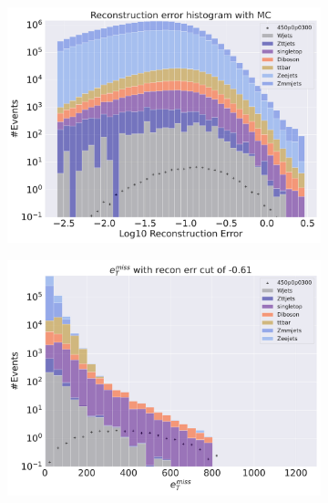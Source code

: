 \begin{figure}[H]
    \centering
    \begin{subfigure}{.40\textwidth}
        \includegraphics[width=\textwidth]{Figures/VAE_testing/small/2lep/b_data_recon_big_rm3_feats_sig_450p0p0300_.pdf}
        \caption{ }
        \label{fig:VAE_2lep_big_450_2}
    \end{subfigure}
    \hfill
    \begin{subfigure}{.40\textwidth}
        \includegraphics[width=\textwidth]{Figures/VAE_testing/big/2lep/b_data_recon_big_rm3_feats_sig_450p0p0300_recon_errcut_-0.61.pdf}
        \caption{}
        \label{fig:VAE_2lep_big_etmiss_450_2}
    \end{subfigure}

\end{figure}
